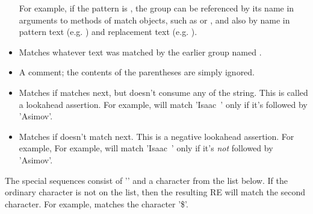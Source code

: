\begin{itemize}
For example, if the pattern is
, the group can be referenced by its
name in arguments to methods of match objects, such as 
or , and also by name in pattern text (e.g. ) and
replacement text (e.g. ).
%
\item[\code{(?P=\var{name})}] Matches whatever text was matched by the earlier group named .
%
\item[\code{(?\#...)}] A comment; the contents of the parentheses are simply ignored.
%
\item[\code{(?=...)}] Matches if  matches next, but doesn't consume any of the string.  This is called a lookahead assertion.  For example, 
 will match 'Isaac~' only if it's followed by 'Asimov'.
%
\item[\code{(?!...)}] Matches if  doesn't match next.  This is a negative lookahead assertion.  For example, 
For example, 
 will match 'Isaac~' only if it's \emph{not} followed by 'Asimov'. 

\end{itemize}

The special sequences consist of '\code{\e}' and a character from the
list below.  If the ordinary character is not on the list, then the
resulting RE will match the second character.  For example,
\code{\e\$} matches the character '\$'.  

